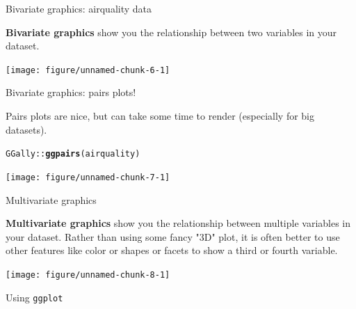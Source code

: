 \documentclass[table]{beamer}\usepackage[]{graphicx}\usepackage[]{xcolor}
\makeatletter
\newcommand{\hlopt}[1]{\textcolor[rgb]{0,0,0}{#1}}%
\newcommand{\hlstd}[1]{\textcolor[rgb]{0.345,0.345,0.345}{#1}}%
\newcommand{\hlkwd}[1]{\textcolor[rgb]{0.737,0.353,0.396}{\textbf{#1}}}%
\newenvironment{kframe}{%
 \def\at@end@of@kframe{}%
 \ifinner\ifhmode%
  \def\at@end@of@kframe{\end{minipage}}%
  \begin{minipage}{\columnwidth}%
 \fi\fi%
 \def\FrameCommand##1{\hskip\@totalleftmargin \hskip-\fboxsep
 \colorbox{shadecolor}{##1}\hskip-\fboxsep
     \hskip-\linewidth \hskip-\@totalleftmargin \hskip\columnwidth}%
 \MakeFramed {\advance\hsize-\width
   \@totalleftmargin\z@ \linewidth\hsize
   \@setminipage}}%
 {\par\unskip\endMakeFramed%
 \at@end@of@kframe}
\newenvironment{knitrout}{}{} %
\makeatother
\begin{document}

\begin{frame}[fragile]{Bivariate graphics: airquality data}

{\bf Bivariate graphics} show you the relationship between two variables in your dataset.

\begin{knitrout}
\color{fgcolor}
\texttt{[image: figure/unnamed-chunk-6-1]} 
\end{knitrout}

\end{frame}


\begin{frame}[fragile]{Bivariate graphics: pairs plots!}

Pairs plots are nice, but can take some time to render (especially for big datasets).
\begin{knitrout}
\color{fgcolor}\begin{kframe}
\begin{alltt}
\hlstd{GGally}\hlopt{::}\hlkwd{ggpairs}\hlstd{(airquality)}
\end{alltt}
\end{kframe}
\texttt{[image: figure/unnamed-chunk-7-1]} 
\end{knitrout}

\end{frame}



\begin{frame}[fragile]{Multivariate graphics}

{\bf Multivariate graphics} show you the relationship between multiple variables in your dataset. Rather than using some fancy "3D" plot, it is often better to use other features like color or shapes or facets to show a third or fourth variable.

\begin{knitrout}
\color{fgcolor}
\texttt{[image: figure/unnamed-chunk-8-1]} 
\end{knitrout}

\end{frame}



\begin{frame}

\centering
\Huge Using {\tt ggplot}


\end{frame}
\end{document}

